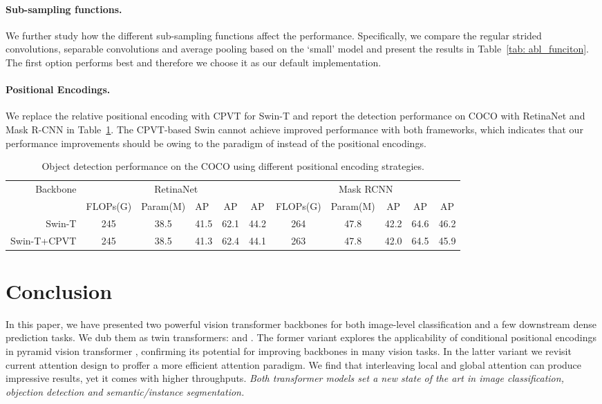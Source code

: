 \documentclass{article}
\def \altour   {Twins-SVT}
\def \pcpvt  {Twins-PCPVT}
\begin{document}
\paragraph{Sub-sampling functions.}
We further study how the different   sub-sampling   functions affect the performance.  Specifically, we compare the regular strided convolutions, separable convolutions and average pooling based on the `small' model and present the results in Table~\ref{tab: abl_funciton}. The first option performs best and therefore we choose it as our default implementation.

\paragraph{Positional Encodings.}
We replace the relative positional encoding with CPVT for Swin-T and report the detection performance on COCO with RetinaNet and Mask R-CNN in Table~\ref{tab: pos_swin}. The CPVT-based Swin cannot achieve improved performance with both frameworks, which indicates that our performance improvements should be owing to the paradigm of \text{\altour} instead of the positional encodings.
\begin{table}[ht]
 \setlength\tabcolsep{2pt}
	\caption{Object detection performance on the COCO using different positional encoding strategies.}
	\label{tab: pos_swin}
	\centering
\small
\begin{tabular}{r|cclcc|ccccc}
	\toprule
	\multirow{2}{*}{Backbone}  &\multicolumn{5}{c|}{RetinaNet} &\multicolumn{5}{c}{Mask RCNN} \\

	& FLOPs(G) &Param(M)&AP &AP &AP& FLOPs(G) &Param(M) &AP &AP &AP  \\
	\midrule
Swin-T \cite{liu2021swin} &245 &38.5&41.5 & 62.1& 44.2& 264& 47.8& 42.2& 64.6& 46.2\\
	Swin-T+CPVT &245 &38.5&41.3& 62.4&44.1 &263&47.8 & 42.0&64.5&45.9\\


	\bottomrule	
\end{tabular}
\end{table}

\section{Conclusion}
In this paper, we have presented  two powerful vision transformer backbones for both image-level classification and a few downstream dense prediction tasks. We dub them as twin transformers: \text{\pcpvt} and \text{\altour}. The former variant explores the applicability of conditional positional encodings \cite{chu2021ConditionalPE} in pyramid vision transformer \cite{wang2021pyramid}, confirming its potential  for improving backbones in many vision tasks. 
In the latter variant we revisit current attention design to proffer 
a more efficient attention paradigm. We find that interleaving local and global attention can produce impressive results, yet it comes with higher throughputs. \textit{Both transformer models set 
a new state of the art in image classification, objection detection and semantic/instance segmentation.}
\end{document}
